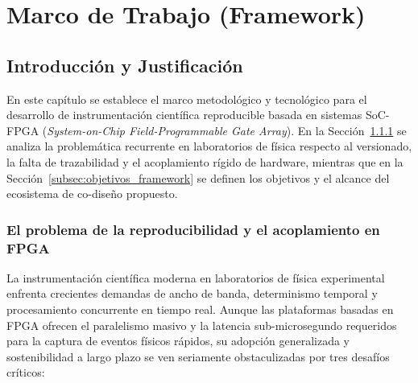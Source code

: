 \documentclass[standalone]{subfiles}
\begin{document}
\chapter{Marco de Trabajo (Framework)}
\label{ch:framework}

\section{Introducción y Justificación}
\label{sec:intro_framework}

En este capítulo se establece el marco metodológico y tecnológico para el desarrollo de instrumentación científica reproducible basada en sistemas SoC-FPGA (\textit{System-on-Chip Field-Programmable Gate Array}). En la Sección~\ref{subsec:problema_fpga} se analiza la problemática recurrente en laboratorios de física respecto al versionado, la falta de trazabilidad y el acoplamiento rígido de hardware, mientras que en la Sección~\ref{subsec:objetivos_framework} se definen los objetivos y el alcance del ecosistema de co-diseño propuesto.

\subsection{El problema de la reproducibilidad y el acoplamiento en FPGA}
\label{subsec:problema_fpga}

La instrumentación científica moderna en laboratorios de física experimental enfrenta crecientes demandas de ancho de banda, determinismo temporal y procesamiento concurrente en tiempo real. Aunque las plataformas basadas en FPGA ofrecen el paralelismo masivo y la latencia sub-microsegundo requeridos para la captura de eventos físicos rápidos, su adopción generalizada y sostenibilidad a largo plazo se ven seriamente obstaculizadas por tres desafíos críticos:
\end{document}
